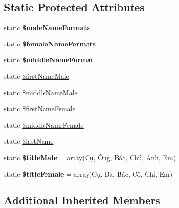 \subsection*{Static Protected Attributes}
\begin{DoxyCompactItemize}
\item 
static {\bfseries \$male\+Name\+Formats}
\item 
static {\bfseries \$female\+Name\+Formats}
\item 
static {\bfseries \$middle\+Name\+Format}
\item 
static \hyperlink{classFaker_1_1Provider_1_1vi__VN_1_1Person_a995e9705e8dca9f652bb254e4feed494}{\$first\+Name\+Male}
\item 
static \hyperlink{classFaker_1_1Provider_1_1vi__VN_1_1Person_acd4131a86a3ac6d21b0861fc0d2a19fc}{\$middle\+Name\+Male}
\item 
static \hyperlink{classFaker_1_1Provider_1_1vi__VN_1_1Person_aa5ac9daadabf51ad95df378b7e1d96b7}{\$first\+Name\+Female}
\item 
static \hyperlink{classFaker_1_1Provider_1_1vi__VN_1_1Person_ae9aca3674140ead2e5b8516259bf69e0}{\$middle\+Name\+Female}
\item 
static \hyperlink{classFaker_1_1Provider_1_1vi__VN_1_1Person_ad101126d2ae05f5991b82eee629f054a}{\$last\+Name}
\item 
\mbox{\label{classFaker_1_1Provider_1_1vi__VN_1_1Person_a5b975f36cf21488876e4a06f7ab70707}} 
static {\bfseries \$title\+Male} = array(\textquotesingle{}Cụ\textquotesingle{}, \textquotesingle{}Ông\textquotesingle{}, \textquotesingle{}Bác\textquotesingle{}, \textquotesingle{}Chú\textquotesingle{}, \textquotesingle{}Anh\textquotesingle{}, \textquotesingle{}Em\textquotesingle{})
\item 
\mbox{\label{classFaker_1_1Provider_1_1vi__VN_1_1Person_a530ff3c2fe73a11f286a9565574149c6}} 
static {\bfseries \$title\+Female} = array(\textquotesingle{}Cụ\textquotesingle{}, \textquotesingle{}Bà\textquotesingle{}, \textquotesingle{}Bác\textquotesingle{}, \textquotesingle{}Cô\textquotesingle{}, \textquotesingle{}Chị\textquotesingle{}, \textquotesingle{}Em\textquotesingle{})
\end{DoxyCompactItemize}
\subsection*{Additional Inherited Members}


